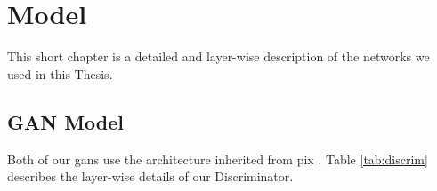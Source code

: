 
\chapter{Model}
\label{cha:model}

This short chapter is a detailed and layer-wise description of the networks we used in this Thesis.

\section{GAN Model}
\label{sec:gan_model}

Both of our \acrshort{gan}s use the architecture inherited from \acrshort{pix}
\cite{pix2pix}. Table \ref{tab:discrim} describes the layer-wise details of our
Discriminator.

